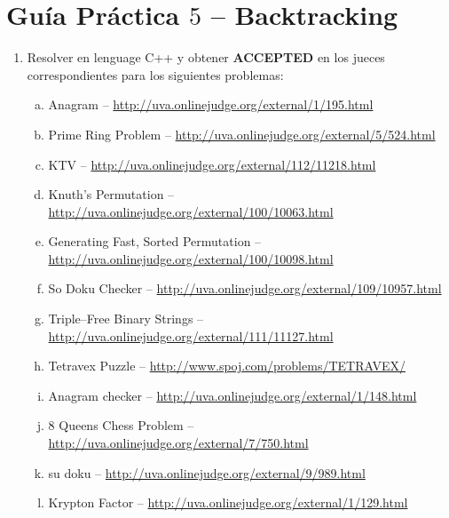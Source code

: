 




\section*{Gu\'ia Pr\'actica $5$ -- Backtracking}

\begin{enumerate}[1 -]
	
	\item Resolver en lenguage C++ y obtener \textbf{ACCEPTED} en los jueces correspondientes para los siguientes problemas:
	
	\begin{enumerate}[a)]
		\item Anagram -- \href{http://uva.onlinejudge.org/external/1/195.html}{http://uva.onlinejudge.org/external/1/195.html}
		\item Prime Ring Problem -- \href{http://uva.onlinejudge.org/external/5/524.html}{http://uva.onlinejudge.org/external/5/524.html}
		\item KTV -- \href{http://uva.onlinejudge.org/external/112/11218.html}{http://uva.onlinejudge.org/external/112/11218.html}
		\item Knuth’s Permutation -- \href{http://uva.onlinejudge.org/external/100/10063.html}{http://uva.onlinejudge.org/external/100/10063.html}
		\item Generating Fast, Sorted Permutation -- \href{http://uva.onlinejudge.org/external/100/10098.html}{http://uva.onlinejudge.org/external/100/10098.html}
		\item So Doku Checker -- \href{http://uva.onlinejudge.org/external/109/10957.html}{http://uva.onlinejudge.org/external/109/10957.html}
		\item Triple--Free Binary Strings -- \href{http://uva.onlinejudge.org/external/111/11127.html}{http://uva.onlinejudge.org/external/111/11127.html}
		\item Tetravex Puzzle -- \href{http://www.spoj.com/problems/TETRAVEX/}{http://www.spoj.com/problems/TETRAVEX/}
		\item Anagram checker -- \href{http://uva.onlinejudge.org/external/1/148.html}{http://uva.onlinejudge.org/external/1/148.html}
		\item 8 Queens Chess Problem  -- \href{http://uva.onlinejudge.org/external/7/750.html}{http://uva.onlinejudge.org/external/7/750.html}

		\item su doku -- \href{http://uva.onlinejudge.org/external/9/989.html}{http://uva.onlinejudge.org/external/9/989.html}
		\item Krypton Factor -- \href{http://uva.onlinejudge.org/external/1/129.html}{http://uva.onlinejudge.org/external/1/129.html}
	\end{enumerate}

\end{enumerate}






